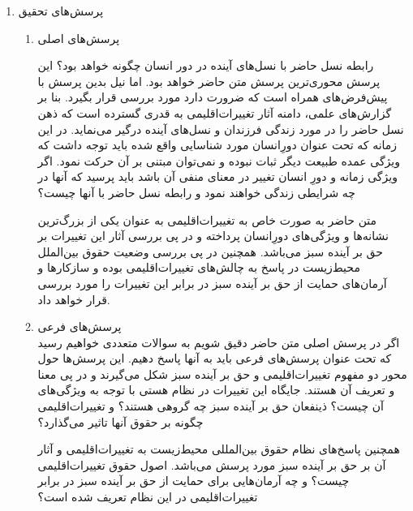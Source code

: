 \begin{enumerate}
	
	
	
	
	
	
	
	\item پرسش‌های تحقیق
	\begin{enumerate}
		
		\item پرسش‌های اصلی
		
		رابطه نسل حاضر با نسل‌های آینده در دور انسان چگونه خواهد بود؟ این پرسش محوری‌ترین پرسش متن حاضر خواهد بود. اما نیل بدین پرسش با پیش‌فرض‌های همراه است که ضرورت دارد مورد بررسی قرار بگیرد. بنا بر گزارش‌های علمی، دامنه آثار تغییرات‌اقلیمی به قدری گسترده است که ذهن نسل حاضر را در مورد زندگی فرزندان و نسل‌های آینده درگیر می‌نماید. در این زمانه که تحت عنوان دورِانسان مورد شناسایی واقع شده باید توجه داشت که ویژگی عمده طبیعت دیگر ثبات نبوده و نمی‌توان مبتنی بر آن حرکت نمود. اگر ویژگی زمانه و دورِ انسان تغییر در معنای منفی آن باشد باید پرسید که آنها در چه شرایطی زندگی خواهند نمود و رابطه نسل‌ حاضر با آنها چیست؟ 
		
		متن حاضر به صورت خاص به تغییرات‌اقلیمی به عنوان یکی از بزرگ‌ترین نشانه‌ها و ویژگی‌های دورِانسان پرداخته و در پی بررسی آثار این تغییرات بر حق بر آینده سبز می‌باشد. همچنین در پی بررسی وضعیت حقوق بین‌الملل محیط‌زیست در پاسخ به چالش‌های تغییرات‌اقلیمی بوده و سازکار‌ها و  آرمان‌های حمایت از حق بر آینده سبز در برابر این تغییرات‌ را مورد بررسی قرار خواهد داد.
			
			
	
		
		\item پرسش‌های فرعی\\
					اگر در پرسش‌ اصلی متن حاضر دقیق شویم به سوالات متعددی خواهیم رسید که تحت عنوان پرسش‌های فرعی باید به آنها پاسخ دهیم. این پرسش‌ها حول محور دو مفهوم تغییرات‌اقلیمی و حق بر آینده سبز شکل می‌گیرند و در پی معنا و تعریف آن هستند. جایگاه این تغییرات در نظام هستی با توجه به ویژگی‌های آن چیست؟ ذینفعان حق بر آینده سبز چه گروهی هستند؟ و تغییرات‌اقلیمی چگونه بر حقوق آنها تاثیر می‌گذارد؟ 
						
همچنین پاسخ‌های نظام حقوق بین‌المللی  محیط‌زیست به تغییرات‌اقلیمی و آثار آن بر حق بر آینده سبز مورد پرسش می‌باشد. اصول حقوق تغییرات‌اقلیمی چیست؟ و چه آرمان‌هایی برای حمایت از حق بر آینده سبز در برابر تغییرات‌اقلیمی در این نظام تعریف شده است؟
			


\end{enumerate}
\end{enumerate}
